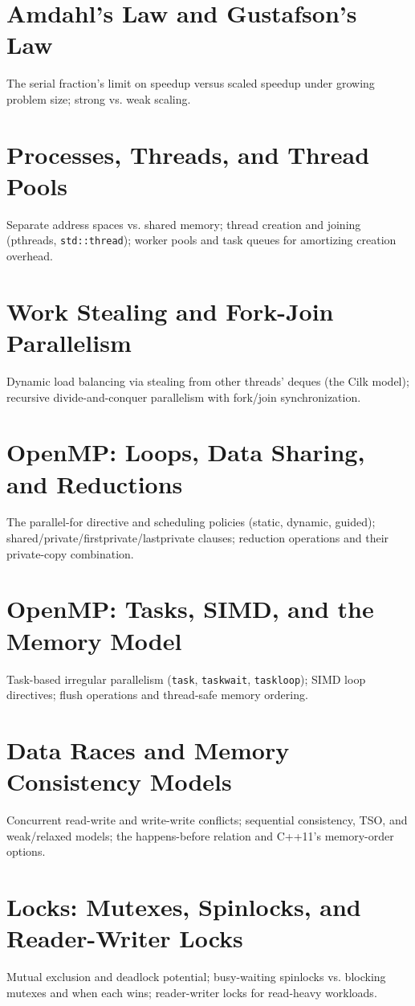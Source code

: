 \chapter{Amdahl's Law and Gustafson's Law}
The serial fraction's limit on speedup versus scaled speedup under growing problem size; strong vs. weak scaling.

\chapter{Processes, Threads, and Thread Pools}
Separate address spaces vs. shared memory; thread creation and joining (pthreads, \texttt{std::thread}); worker pools and task queues for amortizing creation overhead.

\chapter{Work Stealing and Fork-Join Parallelism}
Dynamic load balancing via stealing from other threads' deques (the Cilk model); recursive divide-and-conquer parallelism with fork/join synchronization.

\chapter{OpenMP: Loops, Data Sharing, and Reductions}
The parallel-for directive and scheduling policies (static, dynamic, guided); shared/private/firstprivate/lastprivate clauses; reduction operations and their private-copy combination.

\chapter{OpenMP: Tasks, SIMD, and the Memory Model}
Task-based irregular parallelism (\texttt{task}, \texttt{taskwait}, \texttt{taskloop}); SIMD loop directives; flush operations and thread-safe memory ordering.

\chapter{Data Races and Memory Consistency Models}
Concurrent read-write and write-write conflicts; sequential consistency, TSO, and weak/relaxed models; the happens-before relation and C++11's memory-order options.

\chapter{Locks: Mutexes, Spinlocks, and Reader-Writer Locks}
Mutual exclusion and deadlock potential; busy-waiting spinlocks vs. blocking mutexes and when each wins; reader-writer locks for read-heavy workloads.


